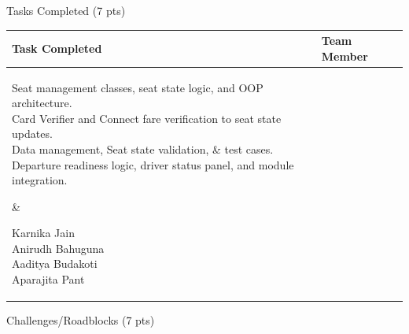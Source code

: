 \documentclass[12pt,a4paper]{article}
\newcommand{\sectiontitle}[1]{%
    {\color{GEUBlue}
    \fontsize{18}{22}\selectfont #1}
}
\newcommand{\instruction}[1]{%
    {\color{InstructionGrey}
    \fontsize{10.5}{13}\selectfont #1}
}
\begin{document}
\newpage


\vspace*{0.15cm}

\sectiontitle{Tasks Completed (7 pts)}

\vspace{0.05cm}


\vspace{0.20cm}

\begin{tabularx}{\textwidth}{
|>{\raggedright\arraybackslash}X
|>{\raggedright\arraybackslash}X|
}
\hline
\textbf{Task Completed} &
\textbf{Team Member}\\
\hline

\parbox[t][5cm][t]{\linewidth}{Seat management classes, seat state logic, and OOP architecture.\\[0.2cm]
Card Verifier and Connect fare verification to seat state updates.\\[0.2cm]
Data management, Seat state validation, \& test cases.\\[0.2cm]
Departure readiness logic, driver status panel, and module integration.}
&
\parbox[t][5cm][t]{\linewidth}{Karnika Jain\\[0.7cm]
Anirudh Bahuguna\\[0.7cm]
Aaditya Budakoti\\[0.7cm]
Aparajita Pant}
\\
\hline
\end{tabularx}

\vspace{0.65cm}

\sectiontitle{Challenges/Roadblocks (7 pts)}

\vspace{0.05cm}


\vspace{0.18cm}
\end{document}
